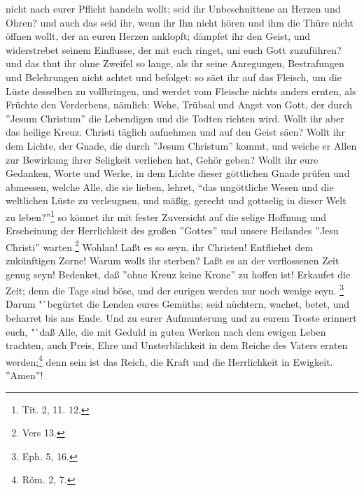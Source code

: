 nicht nach eurer Pflicht handeln wollt; seid ihr Unbeschnittene an Herzen und
Ohren? und auch das seid ihr, wenn ihr Ihn nicht hören und ihm die Thüre nicht
öffnen wollt, der an euren Herzen anklopft; dämpfet ihr den Geist, und
widerstrebet seinem Einflusse, der mit euch ringet, uni euch Gott zuzuführen?
und das thut ihr ohne Zweifel so lange, als ihr seine Anregungen, Bestrafungen
und Belehrungen nicht achtet und befolget: so säet ihr auf das Fleisch, um die
Lüste desselben zu vollbringen, und werdet vom Fleische nichts anders ernten,
als Früchte den Verderbens, nämlich: Wehe, Trübsal und Angst von Gott, der durch
''Jesum Christum'' die Lebendigen und die Todten richten wird. Wollt ihr aber
das heilige Kreuz. Christi täglich aufnehmen und auf den Geist säen? Wollt ihr
dem Lichte, der Gnade, die durch ''Jesum Christum'' kommt, und weiche er Allen
zur Bewirkung ihrer Seligkeit verliehen hat, Gehör geben? Wollt ihr eure
Gedanken, Worte und Werke, in dem Lichte dieser göttlichen Gnade prüfen und
abmessen, welche Alle, die sie lieben, lehret, "`das ungöttliche Wesen und die
weltlichen Lüste zu verleugnen, und mäßig, gerecht und gottselig in dieser Welt
zu leben?"'\footnote{Tit. 2, 11. 12.} so könnet ihr mit fester Zuversicht auf
die selige Hoffnung und Erscheinung der Herrlichkeit des großen ''Gottes'' und
unsere Heilandes ''Jesu Christi'' warten.\footnote{Vers 13.} Wohlan! Laßt es so
seyn, ihr Christen! Entfliehet dem zukünftigen Zorne! Warum wollt ihr sterben?
Laßt es an der verflossenen Zeit genug seyn! Bedenket, daß ''ohne Kreuz keine
Krone'' zu hoffen ist! Erkaufet die Zeit; denn die Tage sind böse, und der
eurigen werden nur noch wenige seyn. \footnote{Eph. 5, 16.} Darum "`begürtet die
Lenden eures Gemüths; seid nüchtern, wachet, betet, und beharret bis ans Ende.
Und zu eurer Aufmunterung und zu eurem Troste erinnert euch, "`daß Alle, die mit
Geduld in guten Werken nach dem ewigen Leben trachten, auch Preis, Ehre und
Unsterblichkeit in dem Reiche des Vaters ernten werden;\footnote{Röm. 2, 7.}
denn sein ist das Reich, die Kraft und die Herrlichkeit in Ewigkeit. ''Amen''!
